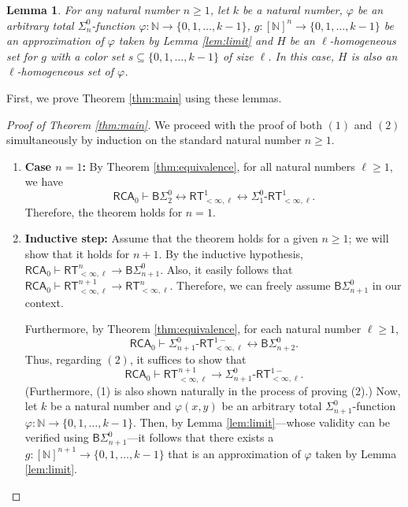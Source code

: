 \documentclass[10pt,reqno]{amsart}
\newtheorem{lemma}[theorem]{Lemma}
\numberwithin{equation}{section}
\begin{document}
\begin{lemma}\label{lem:hom_eval}
For any natural number $n \ge 1$, let $k$ be a natural number, $\varphi$ be an arbitrary total $\Sigma_{n}^{0}$-function $\varphi\colon\mathbb{N}\to\{0,1,\dots,k-1\}$, $g\colon[\mathbb{N}]^{n}\to\{0,1,\dots,k-1\}$ be an approximation of $\varphi$ taken by Lemma \ref{lem:limit} and $H$ be an $\ell$-homogeneous set for $g$ with a color set $s \subseteq \{0,1,\dots,k-1\}$ of size $\ell$. In this case, $H$ is also an $\ell$-homogeneous set of $\varphi$.
\end{lemma}


First, we prove Theorem \ref{thm:main} using these lemmas.
\begin{proof}[Proof of Theorem \ref{thm:main}]
We proceed with the proof of both $(1)$ and $(2)$ simultaneously by induction on the standard natural number $n\ge 1$.


\begin{enumerate}[label=(\roman*),topsep=0.5em,itemsep=0.5em]
  \item \textbf{Case $n=1$:} By Theorem \ref{thm:equivalence}, for all natural numbers $\ell \ge 1$, we have
  \[ \mathsf{RCA}_0\vdash\mathsf{B}\Sigma_{2}^{0}\leftrightarrow\mathsf{RT}_{<\infty,\ell}^{1}\leftrightarrow\Sigma_{1}^{0}\text{-}\mathsf{RT}_{<\infty,\ell}^{1}.
  \]
  Therefore, the theorem holds for $n=1$.


  \item \textbf{Inductive step:} Assume that the theorem holds for a given $n \ge 1$; we will show that it holds for $n+1$.
  By the inductive hypothesis, $\mathsf{RCA}_0\vdash\mathsf{RT}_{<\infty,\ell}^{n}\rightarrow\mathsf{B}\Sigma_{n+1}^{0}$.
  Also, it easily follows that $\mathsf{RCA}_0\vdash\mathsf{RT}_{<\infty,\ell}^{n+1}\rightarrow\mathsf{RT}_{<\infty,\ell}^{n}$. Therefore, we can freely assume $\mathsf{B}\Sigma_{n+1}^{0}$ in our context.


  Furthermore, by Theorem \ref{thm:equivalence}, for each natural number $\ell \ge 1$,
  \[\mathsf{RCA}_0\vdash\Sigma_{n+1}^{0}\text{-}\mathsf{RT}_{<\infty,\ell}^{1-}\leftrightarrow\mathsf{B}\Sigma_{n+2}^{0}. \]
  Thus, regarding $(2)$, it suffices to show that
  \[\mathsf{RCA}_0\vdash\mathsf{RT}_{<\infty,\ell}^{n+1}\rightarrow\Sigma_{n+1}^{0}\text{-}\mathsf{RT}_{<\infty,\ell}^{1-}.
  \]
 (Furthermore, (1) is also shown naturally in the process of proving (2).) Now, let $k$ be a natural number and $\varphi(x,y)$ be an arbitrary total $\Sigma_{n+1}^{0}$-function $\varphi\colon\mathbb{N}\to\{0,1,\dots,k-1\}$. Then, by Lemma \ref{lem:limit}---whose validity can be verified using $\mathsf{B}\Sigma_{n+1}^{0}$---it follows that there exists a $g\colon[\mathbb{N}]^{n+1}\to\{0,1,\dots,k-1\}$ that is an approximation of $\varphi$ taken by Lemma \ref{lem:limit}.



\end{enumerate}
\end{proof}
\end{document}
